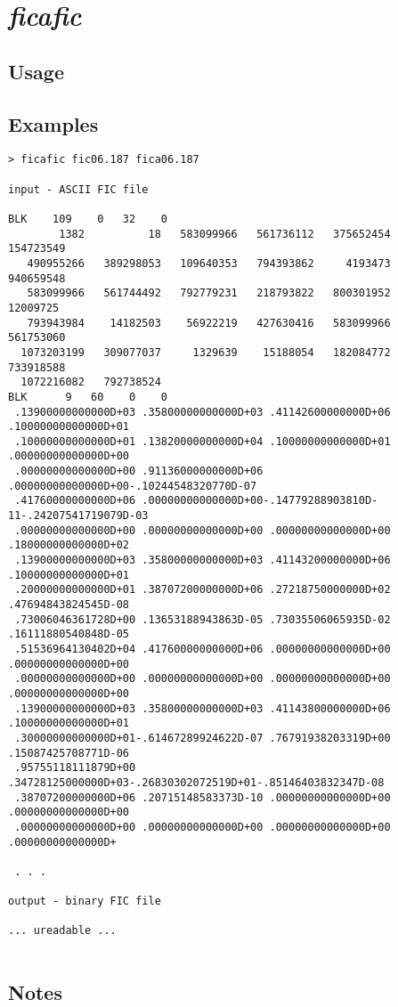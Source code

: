 \section{\emph{ficafic}}
\subsection{Usage}
\subsection{Examples}
\begin{Verbatim}
> ficafic fic06.187 fica06.187

input - ASCII FIC file

BLK    109    0   32    0
        1382          18   583099966   561736112   375652454   154723549
   490955266   389298053   109640353   794393862     4193473   940659548
   583099966   561744492   792779231   218793822   800301952    12009725
   793943984    14182503    56922219   427630416   583099966   561753060
  1073203199   309077037     1329639    15188054   182084772   733918588
  1072216082   792738524
BLK      9   60    0    0
 .13900000000000D+03 .35800000000000D+03 .41142600000000D+06 .10000000000000D+01
 .10000000000000D+01 .13820000000000D+04 .10000000000000D+01 .00000000000000D+00
 .00000000000000D+00 .91136000000000D+06 .00000000000000D+00-.10244548320770D-07
 .41760000000000D+06 .00000000000000D+00-.14779288903810D-11-.24207541719079D-03
 .00000000000000D+00 .00000000000000D+00 .00000000000000D+00 .18000000000000D+02
 .13900000000000D+03 .35800000000000D+03 .41143200000000D+06 .10000000000000D+01
 .20000000000000D+01 .38707200000000D+06 .27218750000000D+02 .47694843824545D-08
 .73006046361728D+00 .13653188943863D-05 .73035506065935D-02 .16111880540848D-05
 .51536964130402D+04 .41760000000000D+06 .00000000000000D+00 .00000000000000D+00
 .00000000000000D+00 .00000000000000D+00 .00000000000000D+00 .00000000000000D+00
 .13900000000000D+03 .35800000000000D+03 .41143800000000D+06 .10000000000000D+01
 .30000000000000D+01-.61467289924622D-07 .76791938203319D+00 .15087425708771D-06
 .95755118111879D+00 .34728125000000D+03-.26830302072519D+01-.85146403832347D-08
 .38707200000000D+06 .20715148583373D-10 .00000000000000D+00 .00000000000000D+00
 .00000000000000D+00 .00000000000000D+00 .00000000000000D+00 .00000000000000D+

 . . .

output - binary FIC file

... ureadable ...


\end{Verbatim}
\subsection{Notes}
